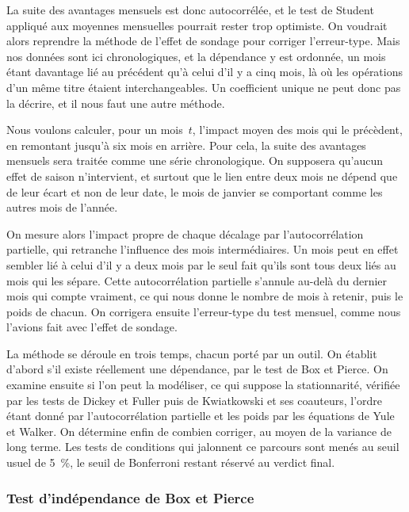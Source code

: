La suite des avantages mensuels est donc autocorrélée, et le test de Student
appliqué aux moyennes mensuelles pourrait rester trop optimiste. On voudrait
alors reprendre la méthode de l'effet de sondage pour corriger l'erreur-type.
Mais nos données sont ici chronologiques, et la dépendance y est ordonnée, un
mois étant davantage lié au précédent qu'à celui d'il y a cinq mois, là où les
opérations d'un même titre étaient interchangeables. Un coefficient unique ne
peut donc pas la décrire, et il nous faut une autre méthode.

Nous voulons calculer, pour un mois~$t$, l'impact moyen des mois qui le
précèdent, en remontant jusqu'à six mois en arrière. Pour cela, la suite des
avantages mensuels sera traitée comme une série chronologique. On supposera
qu'aucun effet de saison n'intervient, et surtout que le lien entre deux mois
ne dépend que de leur écart et non de leur date, le mois de janvier se
comportant comme les autres mois de l'année.

On mesure alors l'impact propre de chaque décalage par l'autocorrélation
partielle, qui retranche l'influence des mois intermédiaires. Un mois peut en
effet sembler lié à celui d'il y a deux mois par le seul fait qu'ils sont tous
deux liés au mois qui les sépare. Cette autocorrélation partielle s'annule
au-delà du dernier mois qui compte vraiment, ce qui nous donne le nombre de
mois à retenir, puis le poids de chacun. On corrigera ensuite l'erreur-type du
test mensuel, comme nous l'avions fait avec l'effet de sondage.

La méthode se déroule en trois temps, chacun porté par un outil. On établit
d'abord s'il existe réellement une dépendance, par le test de Box et Pierce.
On examine ensuite si l'on peut la modéliser, ce qui suppose la stationnarité,
vérifiée par les tests de Dickey et Fuller puis de Kwiatkowski et ses
coauteurs, l'ordre étant donné par l'autocorrélation partielle et les poids
par les équations de Yule et Walker. On détermine enfin de combien corriger,
au moyen de la variance de long terme. Les tests de conditions qui jalonnent
ce parcours sont menés au seuil usuel de 5~\%, le seuil de Bonferroni restant
réservé au verdict final.

\subsubsection*{Test d'indépendance de Box et Pierce}

